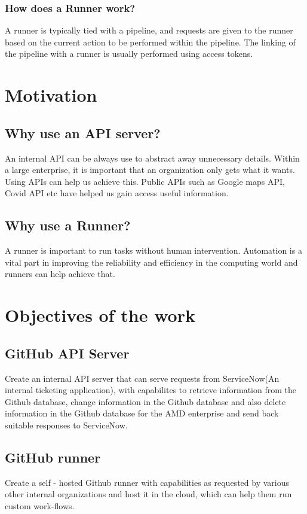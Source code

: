\subsubsection{How does a Runner work?}
A runner is typically tied with a pipeline, and requests are given to the runner based on the current action to be performed within the pipeline. The linking of the pipeline with a runner is usually performed using access tokens.

\section{Motivation}
\subsection{Why use an API server?}
An internal API can be always use to abstract away unnecessary details. Within a large enterprise, it is important that an organization only gets what it wants. Using APIs can help us achieve this.
Public APIs such as Google maps API, Covid API etc have helped us gain access useful information.
\subsection{Why use a Runner?}
A runner is important to run tasks without human intervention. Automation is a vital part in improving the reliability and efficiency in the computing world and runners can help achieve that.
\section{Objectives of the work}
\subsection{GitHub API Server}
Create an internal API server that can serve requests from ServiceNow(An internal ticketing application), with capabilites to retrieve information from the Github database, change information in the Github database and also delete information in the Github database for the AMD enterprise and send back suitable responses to ServiceNow.
\subsection{GitHub runner}
Create a self - hosted Github runner with capabilities as requested by various other internal organizations and host it in the cloud, which can help them run custom work-flows.
